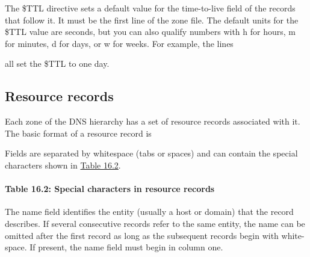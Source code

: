 \protect\hypertarget{part0024_split_020.htmlux5cux23_idTextAnchor868}{}{}The
\protect\hypertarget{part0024_split_020.htmlux5cux23_idIndexMarker2062}{}{}{\$TTL}
directive sets a default value for the time-to-live field of the records
that follow it. It must be the first line of the zone file. The default
units for the {\$TTL} value are seconds, but you can also qualify
numbers with {h} for hours, {m} for minutes, {d} for days, or {w} for
weeks. For example, the lines


all set the {\$TTL} to one day.

\protect\hypertarget{part0024_split_021.html}{}{}

\hypertarget{part0024_split_021.htmlux5cux23_idContainer1069}{}
\hypertarget{part0024_split_021.htmlux5cux23calibre_pb_20}{%
\subsection[Resource
records]{\texorpdfstring{\protect\hypertarget{part0024_split_021.htmlux5cux23_idTextAnchor869}{}{}\protect\hypertarget{part0024_split_021.htmlux5cux23_idIndexMarker2063}{}{}Resource
records}{Resource records}}\label{part0024_split_021.htmlux5cux23calibre_pb_20}}

Each zone of the DNS hierarchy has a set of resource records associated
with it. The basic format of a resource record is


Fields are separated by whitespace (tabs or spaces) and can contain the
special characters shown in
\protect\hyperlink{part0024_split_021.htmlux5cux23_idTextAnchor870}{Table
16.2}.

\paragraph[{Table 16.2: }Special characters in resource
records]{\texorpdfstring{{Table 16.2:
}\protect\hypertarget{part0024_split_021.htmlux5cux23_idIndexMarker2064}{}{}\protect\hypertarget{part0024_split_021.htmlux5cux23_idTextAnchor870}{}{}Special
characters in resource
records}{Table 16.2: Special characters in resource records}}


The {name} field identifies the entity (usually a host or domain) that
the record describes. If several consecutive records refer to the same
entity, the name can be omitted after the first record as long as the
subsequent records begin with white-space. If present, the {name} field
must begin in column one.

